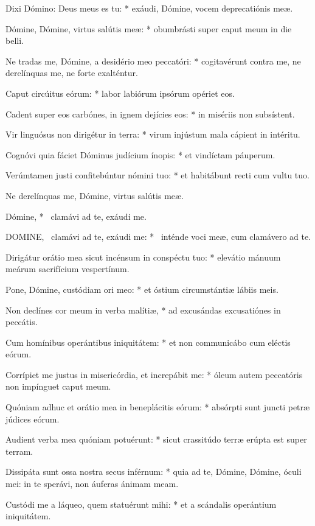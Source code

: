Dixi Dómino: Deus meus es tu: * exáudi, Dómine, vocem deprecatiónis meæ.

Dómine, Dómine, virtus salútis meæ: * obumbrásti super caput meum in die belli.

Ne tradas me, Dómine, a desidério meo peccatóri: * cogitavérunt contra me, ne derelínquas me, ne forte exalténtur.

Caput circúitus eórum: * labor labiórum ipsórum opériet eos.

Cadent super eos carbónes, in ignem dejícies eos: * in misériis non subsístent.

Vir linguósus non dirigétur in terra: * virum injústum mala cápient in intéritu.

Cognóvi quia fáciet Dóminus judícium ínopis: * et vindíctam páuperum.

Verúmtamen justi confitebúntur nómini tuo: * et habitábunt recti cum vultu tuo.

 Ne derelínquas me, Dómine, virtus salútis meæ.

 Dómine, * \textdagger\ clamávi ad te, exáudi me. \textdaggerdbl


\lettrine[lines=2]{D}{OMINE}, \textdagger\ clamávi ad te, exáudi me: * \textdaggerdbl\ inténde voci meæ, cum clamávero ad te.

Dirigátur orátio mea sicut incénsum in conspéctu tuo: * elevátio mánuum meárum sacrifícium vespertínum.

Pone, Dómine, custódiam ori meo: * et óstium circumstántiæ lábiis meis.

Non declínes cor meum in verba malítiæ, * ad excusándas excusatiónes in peccátis.

Cum homínibus operántibus iniquitátem: * et non communicábo cum eléctis eórum.

Corrípiet me justus in misericórdia, et increpábit me: * óleum autem peccatóris non impínguet caput meum.

Quóniam adhuc et orátio mea in beneplácitis eórum: * absórpti sunt juncti petræ júdices eórum.

Audient verba mea quóniam potuérunt: * sicut crassitúdo terræ erúpta est super terram.

Dissipáta sunt ossa nostra secus inférnum: * quia ad te, Dómine, Dómine, óculi mei: in te sperávi, non áuferas ánimam meam.

Custódi me a láqueo, quem statuérunt mihi: * et a scándalis operántium iniquitátem.

